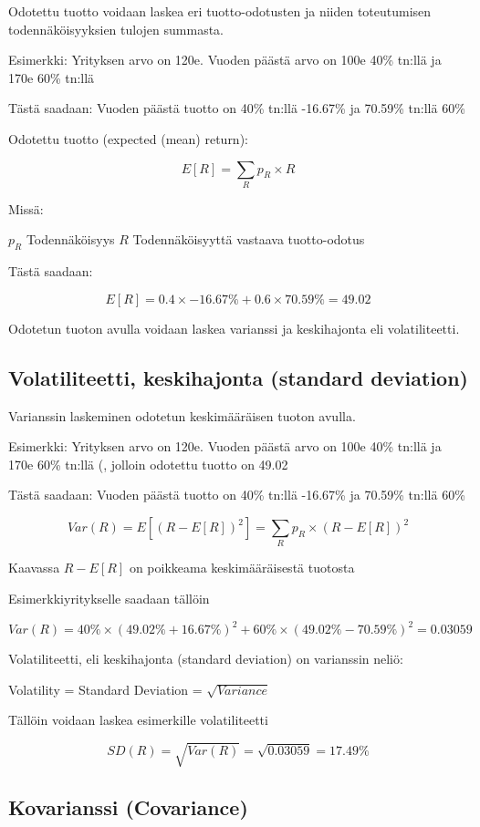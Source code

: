\documentclass[a4paper]{article}
\begin{document}
Odotettu tuotto voidaan laskea eri tuotto-odotusten ja niiden toteutumisen todennäköisyyksien tulojen summasta.

Esimerkki: Yrityksen arvo on 120e. Vuoden päästä arvo on 100e 40\% tn:llä ja 170e 60\% tn:llä

Tästä saadaan: Vuoden päästä tuotto on 40\% tn:llä -16.67\% ja 70.59\% tn:llä 60\%

Odotettu tuotto (expected (mean) return):

\[
E[R] = \sum_R{p_R \times R}
\]

Missä:

$p_R$ \quad Todennäköisyys
$R$ \quad Todennäköisyyttä vastaava tuotto-odotus

Tästä saadaan:

\[
E[R] = 0.4 \times -16.67\% + 0.6 \times 70.59\% = 49.02%
\]

Odotetun tuoton avulla voidaan laskea varianssi ja keskihajonta eli volatiliteetti.

\subsection{Volatiliteetti, keskihajonta (standard deviation)}

Varianssin laskeminen odotetun keskimääräisen tuoton avulla.

Esimerkki: Yrityksen arvo on 120e. Vuoden päästä arvo on 100e 40\% tn:llä ja 170e 60\% tn:llä (, jolloin odotettu tuotto on 49.02%

Tästä saadaan: Vuoden päästä tuotto on 40\% tn:llä -16.67\% ja 70.59\% tn:llä 60\%

\[
Var(R) = E[(R - E[R])^2] = \sum_R{p_R \times (R - E[R])^2}
\]

Kaavassa $R - E[R]$ on poikkeama keskimääräisestä tuotosta

Esimerkkiyritykselle saadaan tällöin

\[
Var(R) = 40\% \times (49.02\% + 16.67\%)^2 + 60\% \times (49.02\% - 70.59\%)^2 = 0.03059
\]

Volatiliteetti, eli keskihajonta (standard deviation) on varianssin neliö:

Volatility = Standard Deviation = $\sqrt{Variance}$

Tällöin voidaan laskea esimerkille volatiliteetti

\[
SD(R) = \sqrt{Var(R)} = \sqrt{0.03059} = 17.49\%
\]

\subsection{Kovarianssi (Covariance)}
\end{document}
